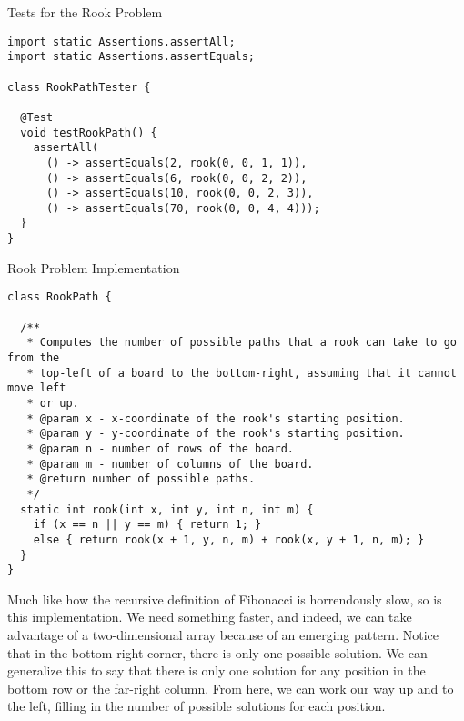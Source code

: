 
\begin{cl}[]{Tests for the Rook Problem}
\begin{lstlisting}[language=MyJava]
import static Assertions.assertAll;
import static Assertions.assertEquals;

class RookPathTester {

  @Test
  void testRookPath() {
    assertAll(
      () -> assertEquals(2, rook(0, 0, 1, 1)),
      () -> assertEquals(6, rook(0, 0, 2, 2)),
      () -> assertEquals(10, rook(0, 0, 2, 3)),
      () -> assertEquals(70, rook(0, 0, 4, 4)));
  }
}
\end{lstlisting}
\end{cl}

\begin{cl}[]{Rook Problem Implementation}
\begin{lstlisting}[language=MyJava]
class RookPath {

  /**
   * Computes the number of possible paths that a rook can take to go from the
   * top-left of a board to the bottom-right, assuming that it cannot move left
   * or up.
   * @param x - x-coordinate of the rook's starting position.
   * @param y - y-coordinate of the rook's starting position.
   * @param n - number of rows of the board.
   * @param m - number of columns of the board.
   * @return number of possible paths.
   */
  static int rook(int x, int y, int n, int m) {
    if (x == n || y == m) { return 1; }
    else { return rook(x + 1, y, n, m) + rook(x, y + 1, n, m); }
  }
}
\end{lstlisting}
\end{cl}

Much like how the recursive definition of Fibonacci is horrendously slow, so is this implementation. We need something faster, and indeed, we can take advantage of a two-dimensional array because of an emerging pattern. Notice that in the bottom-right corner, there is only one possible solution. We can generalize this to say that there is only one solution for any position in the bottom row or the far-right column. From here, we can work our way up and to the left, filling in the number of possible solutions for each position. 

